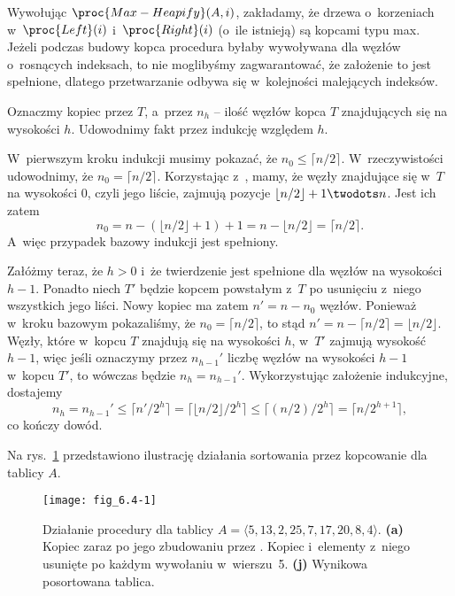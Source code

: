 \exercise %
Wywołując $\proc{Max-Heapify}(A,i)$, zakładamy, że drzewa o~korzeniach w~$\proc{Left}(i)$ i~$\proc{Right}(i)$ (o~ile istnieją) są kopcami typu max.
Jeżeli podczas budowy kopca procedura  byłaby wywoływana dla węzłów o~rosnących indeksach, to nie moglibyśmy zagwarantować, że założenie to jest spełnione, dlatego przetwarzanie odbywa się w~kolejności malejących indeksów.

\exercise %
Oznaczmy kopiec przez $T$, a~przez $n_h$ -- ilość węzłów kopca $T$ znajdujących się na wysokości $h$.
Udowodnimy fakt przez indukcję względem $h$.

W~pierwszym kroku indukcji musimy pokazać, że $n_0\le\lceil n/2\rceil$.
W~rzeczywistości udowodnimy, że $n_0=\lceil n/2\rceil$.
Korzystając z~, mamy, że węzły znajdujące się w~$T$ na wysokości 0, czyli jego liście, zajmują pozycje $\lfloor n/2\rfloor+1\twodots n$.
Jest ich zatem
\[
    n_0 = n-(\lfloor n/2\rfloor+1)+1 = n-\lfloor n/2\rfloor = \lceil n/2\rceil.
\]
A~więc przypadek bazowy indukcji jest spełniony.

Załóżmy teraz, że $h>0$ i~że twierdzenie jest spełnione dla węzłów na wysokości $h-1$.
Ponadto niech $T'$ będzie kopcem powstałym z~$T$ po usunięciu z~niego wszystkich jego liści.
Nowy kopiec ma zatem $n'=n-n_0$ węzłów.
Ponieważ w~kroku bazowym pokazaliśmy, że $n_0=\lceil n/2\rceil$, to stąd $n'=n-\lceil n/2\rceil=\lfloor n/2\rfloor$.
Węzły, które w~kopcu $T$ znajdują się na wysokości $h$, w~$T'$ zajmują wysokość $h-1$, więc jeśli oznaczymy przez $n_{h-1}'$ liczbę węzłów na wysokości $h-1$ w~kopcu $T'$, to wówczas będzie $n_h=n_{h-1}'$.
Wykorzystując założenie indukcyjne, dostajemy
\[
    n_h = n_{h-1}' \le \lceil n'\!/2^h\rceil = \lceil\lfloor n/2\rfloor/2^h\rceil \le \lceil(n/2)/2^h\rceil = \lceil n/2^{h+1}\rceil,
\]
co kończy dowód.


\exercise %
Na rys.~\ref{fig:6.4-1} przedstawiono ilustrację działania sortowania przez kopcowanie dla tablicy $A$.
\begin{figure}[ht]
	\begin{center}
		\texttt{[image: fig\_6.4-1]}
	\end{center}
	\caption{Działanie procedury  dla tablicy $A=\langle5,13,2,25,7,17,20,8,4\rangle$.
{\sffamily\bfseries(a)} Kopiec zaraz po jego zbudowaniu przez .
{\sffamily\bfseries{}} Kopiec i~elementy z~niego usunięte po każdym wywołaniu  w~wierszu~5.
{\sffamily\bfseries(j)} Wynikowa posortowana tablica.} \label{fig:6.4-1}
\end{figure}

